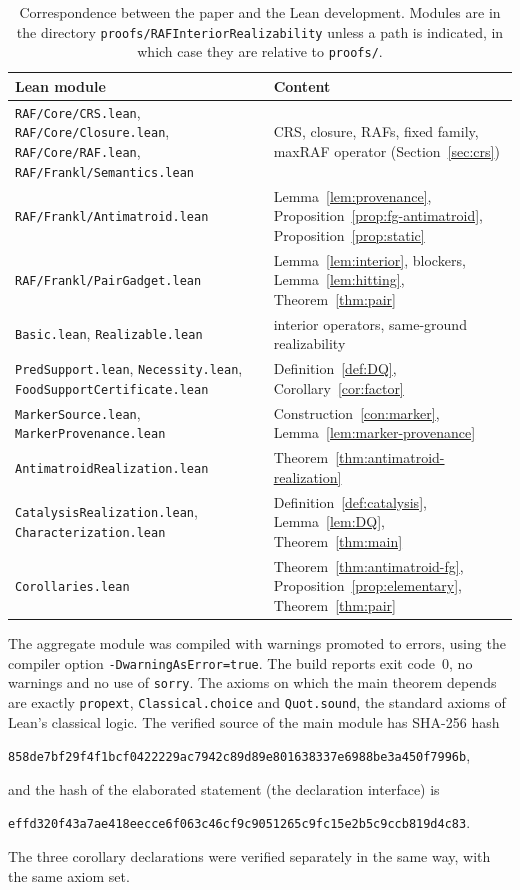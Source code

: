 \documentclass[11pt,a4paper]{article}
\theoremstyle{plain}
\theoremstyle{definition}
\theoremstyle{remark}
\newcommand{\lean}[1]{\texttt{#1}}
\begin{document}
\begin{table}[ht]
\centering\footnotesize
\begin{tabular}{@{}>{\raggedright\arraybackslash}p{}>{\raggedright\arraybackslash}p{}@{}}
\toprule
Lean module & Content \\
\midrule
\lean{RAF/Core/CRS.lean}, \lean{RAF/Core/Closure.lean}, \lean{RAF/Core/RAF.lean}, \lean{RAF/Frankl/Semantics.lean} & CRS, closure, RAFs, fixed family, maxRAF operator (Section~\ref{sec:crs}) \\
\lean{RAF/Frankl/Antimatroid.lean} & Lemma~\ref{lem:provenance}, Proposition~\ref{prop:fg-antimatroid}, Proposition~\ref{prop:static} \\
\lean{RAF/Frankl/PairGadget.lean} & Lemma~\ref{lem:interior}, blockers, Lemma~\ref{lem:hitting}, Theorem~\ref{thm:pair} \\
\lean{Basic.lean}, \lean{Realizable.lean} & interior operators, same-ground realizability \\
\lean{PredSupport.lean}, \lean{Necessity.lean}, \lean{FoodSupportCertificate.lean} & Definition~\ref{def:DQ}, Corollary~\ref{cor:factor} \\
\lean{MarkerSource.lean}, \lean{MarkerProvenance.lean} & Construction~\ref{con:marker}, Lemma~\ref{lem:marker-provenance} \\
\lean{AntimatroidRealization.lean} & Theorem~\ref{thm:antimatroid-realization} \\
\lean{CatalysisRealization.lean}, \lean{Characterization.lean} & Definition~\ref{def:catalysis}, Lemma~\ref{lem:DQ}, Theorem~\ref{thm:main} \\
\lean{Corollaries.lean} & Theorem~\ref{thm:antimatroid-fg}, Proposition~\ref{prop:elementary}, Theorem~\ref{thm:pair} \\
\bottomrule
\end{tabular}
\caption{Correspondence between the paper and the Lean development. Modules are in the directory \lean{proofs/RAFInteriorRealizability} unless a path is indicated, in which case they are relative to \lean{proofs/}.}
\label{tab:modules}
\end{table}

The aggregate module was compiled with warnings promoted to errors, using the compiler option \lean{-DwarningAsError=true}. The build reports exit code~0, no warnings and no use of \lean{sorry}. The axioms on which the main theorem depends are exactly \lean{propext}, \lean{Classical.choice} and \lean{Quot.sound}, the standard axioms of Lean's classical logic. The verified source of the main module has SHA-256 hash
\begin{center}\small\texttt{858de7bf29f4f1bcf0422229ac7942c89d89e801638337e6988be3a450f7996b},\end{center}
and the hash of the elaborated statement (the declaration interface) is
\begin{center}\small\texttt{effd320f43a7ae418eecce6f063c46cf9c9051265c9fc15e2b5c9ccb819d4c83}.\end{center}
The three corollary declarations were verified separately in the same way, with the same axiom set.
\end{document}
